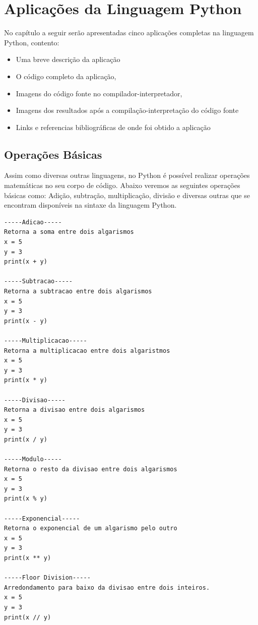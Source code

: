 


\chapter{ Aplica\c{c}\~{o}es da Linguagem Python}

No capítulo a seguir serão apresentadas cinco aplica\c{c}\~{o}es completas na linguagem Python, contento:
\begin{itemize}
  \item Uma breve descri\c{c}\~{a}o da aplica\c{c}\~{a}o
  \item O c\'{o}digo completo da aplica\c{c}\~{a}o,
  \item Imagens do c\'{o}digo fonte no compilador-interpretador,
  \item Imagens dos resultados ap\'{o}s a compila\c{c}\~{a}o-interpreta\c{c}\~{a}o do c\'{o}digo fonte
  \item Links e referencias bibliogr\'{a}ficas de onde foi obtido a aplica\c{c}\~{a}o
\end{itemize}




    \section{Opera\c{c}\~{o}es Básicas}

Assim como diversas outras linguagens, no Python é possível realizar operações matemáticas no seu corpo de código. Abaixo veremos as seguintes operações básicas como: Adição, subtração, multiplicação, divisão e diversas outras que se encontram disponíveis na sintaxe da linguagem Python.

\begin{lstlisting}
-----Adicao-----
Retorna a soma entre dois algarismos 	
x = 5
y = 3
print(x + y)

-----Subtracao-----
Retorna a subtracao entre dois algarismos
x = 5
y = 3
print(x - y)	
	
-----Multiplicacao-----
Retorna a multiplicacao entre dois algaristmos 
x = 5
y = 3
print(x * y)

-----Divisao-----
Retorna a divisao entre dois algarismos
x = 5
y = 3
print(x / y)

-----Modulo-----
Retorna o resto da divisao entre dois algarismos
x = 5
y = 3
print(x % y)

-----Exponencial-----
Retorna o exponencial de um algarismo pelo outro
x = 5
y = 3
print(x ** y)

-----Floor Division-----
Arredondamento para baixo da divisao entre dois inteiros.
x = 5
y = 3
print(x // y)
\end{lstlisting}

